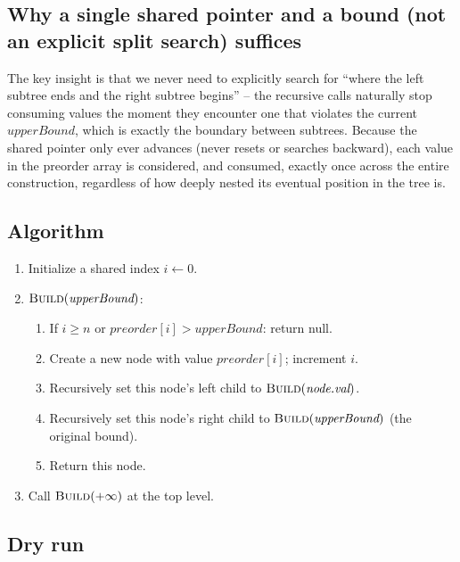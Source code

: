 \subsection*{Why a single shared pointer and a bound (not an explicit split search) suffices}

The key insight is that we never need to explicitly search for ``where
the left subtree ends and the right subtree begins'' -- the recursive
calls naturally stop consuming values the moment they encounter one that
violates the current $\textit{upperBound}$, which is exactly the boundary
between subtrees. Because the shared pointer only ever advances (never
resets or searches backward), each value in the preorder array is
considered, and consumed, exactly once across the entire construction,
regardless of how deeply nested its eventual position in the tree is.

\subsection*{Algorithm}

\begin{enumerate}
  \item Initialize a shared index $i \gets 0$.
  \item $\textsc{Build}(\textit{upperBound})$:
  \begin{enumerate}
    \item If $i \ge n$ or $\textit{preorder}[i] > \textit{upperBound}$:
          return null.
    \item Create a new node with value $\textit{preorder}[i]$;
          increment $i$.
    \item Recursively set this node's left child to
          $\textsc{Build}(\textit{node.val})$.
    \item Recursively set this node's right child to
          $\textsc{Build}(\textit{upperBound})$ (the original bound).
    \item Return this node.
  \end{enumerate}
  \item Call $\textsc{Build}(+\infty)$ at the top level.
\end{enumerate}

\subsection*{Dry run}


